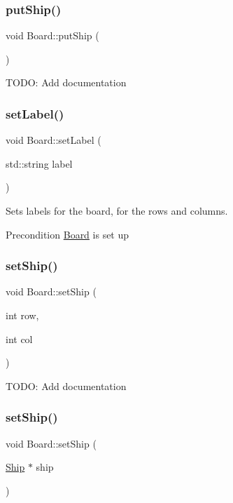 \subsubsection{\texorpdfstring{putShip()}{putShip()}}
{\footnotesize\ttfamily void Board\+::put\+Ship (\begin{DoxyParamCaption}{ }\end{DoxyParamCaption})}

T\+O\+DO\+: Add documentation \mbox{\label{classBoard_a7a97997bb60144af98dd6e1d9bef65ba}} 
\subsubsection{\texorpdfstring{setLabel()}{setLabel()}}
{\footnotesize\ttfamily void Board\+::set\+Label (\begin{DoxyParamCaption}\item[{std\+::string}]{label }\end{DoxyParamCaption})}



Sets labels for the board, for the rows and columns. 

\begin{DoxyPrecond}{Precondition}
\mbox{\hyperlink{classBoard}{Board}} is set up 
\end{DoxyPrecond}
\mbox{\label{classBoard_ac91459b71b1d94be33fe02bcb21c182e}} 
\subsubsection{\texorpdfstring{setShip()}{setShip()}\hspace{0.1cm}{\footnotesize\ttfamily [1/2]}}
{\footnotesize\ttfamily void Board\+::set\+Ship (\begin{DoxyParamCaption}\item[{int}]{row,  }\item[{int}]{col }\end{DoxyParamCaption})}

T\+O\+DO\+: Add documentation \mbox{\label{classBoard_a753f4f1beb3fe211c2f97ade27049f6d}} 
\subsubsection{\texorpdfstring{setShip()}{setShip()}\hspace{0.1cm}{\footnotesize\ttfamily [2/2]}}
{\footnotesize\ttfamily void Board\+::set\+Ship (\begin{DoxyParamCaption}\item[{\mbox{\hyperlink{classShip}{Ship}} $\ast$}]{ship }\end{DoxyParamCaption})}



